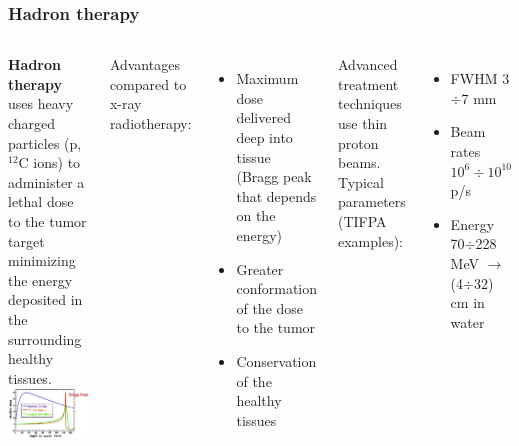 \documentclass[aspectratio=169]{beamer}
\begin{document}
	\begin{frame}
	\frametitle{Hadron therapy}
		\begin{columns}
		\begin{center}
			\textbf{Hadron therapy} uses heavy charged particles (p, ${}^{12}$C ions) to administer a lethal dose to the tumor target minimizing the energy deposited in the surrounding healthy tissues.
			\includegraphics[width=0.95 \textwidth]{IMG/Bragg_Peak.PNG}
		\end{center}
		
			{\color{blue} Advantages compared to x-ray radiotherapy:}
			\begin{itemize}
				\item Maximum dose delivered deep into tissue (Bragg peak that depends on the energy)
				\item Greater conformation of the dose to the tumor
				\item Conservation of the healthy tissues 
			\end{itemize}
		\vspace{1 cm}
			{\color{blue} Advanced treatment techniques use thin proton beams. \\ Typical parameters (TIFPA examples):}
			\begin{itemize}
				\item FWHM 3$\div$7 mm
				\item Beam rates $10^6\div10^{10}$ p/s
				\item Energy  70$\div$228 MeV $\rightarrow$ (4$\div$32) cm in water
			\end{itemize}
		
		\end{columns}
	\end{frame}
\end{document}
